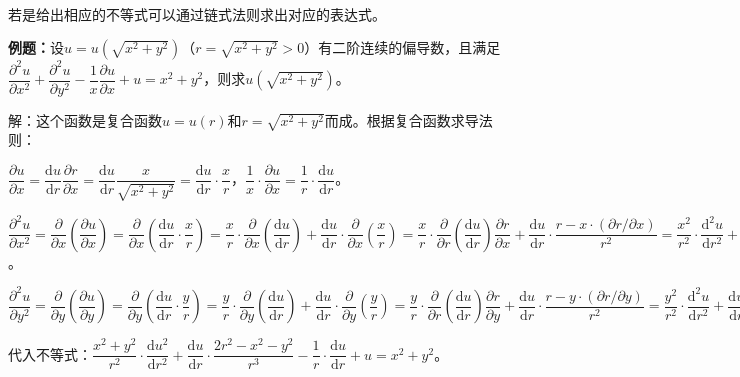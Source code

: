 \paragraph{} \leavevmode \medskip

若是给出相应的不等式可以通过链式法则求出对应的表达式。

\textbf{例题：}设$u=u(\sqrt{x^2+y^2})$（$r=\sqrt{x^2+y^2}>0$）有二阶连续的偏导数，且满足$\dfrac{\partial^2u}{\partial x^2}+\dfrac{\partial^2u}{\partial y^2}-\dfrac{1}{x}\dfrac{\partial u}{\partial x}+u=x^2+y^2$，则求$u(\sqrt{x^2+y^2})$。

解：这个函数是复合函数$u=u(r)$和$r=\sqrt{x^2+y^2}$而成。根据复合函数求导法则：

$\dfrac{\partial u}{\partial x}=\dfrac{\textrm{d}u}{\textrm{d}r}\dfrac{\partial r}{\partial x}=\dfrac{\textrm{d}u}{\textrm{d}r}\dfrac{x}{\sqrt{x^2+y^2}}=\dfrac{\textrm{d}u}{\textrm{d}r}\cdot\dfrac{x}{r}$，$\dfrac{1}{x}\cdot\dfrac{\partial u}{\partial x}=\dfrac{1}{r}\cdot\dfrac{\textrm{d}u}{\textrm{d}r}$。

$\dfrac{\partial^2u}{\partial x^2}=\dfrac{\partial}{\partial x}\left(\dfrac{\partial u}{\partial x}\right)=\dfrac{\partial}{\partial x}\left(\dfrac{\textrm{d}u}{\textrm{d}r}\cdot\dfrac{x}{r}\right)=\dfrac{x}{r}\cdot\dfrac{\partial}{\partial x}\left(\dfrac{\textrm{d}u}{\textrm{d}r}\right)+\dfrac{\textrm{d}u}{\textrm{d}r}\cdot\dfrac{\partial}{\partial x}\left(\dfrac{x}{r}\right)=\dfrac{x}{r}\cdot\dfrac{\partial}{\partial r}\left(\dfrac{\textrm{d}u}{\textrm{d}r}\right)\dfrac{\partial r}{\partial x}+\dfrac{\textrm{d}u}{\textrm{d}r}\cdot\dfrac{r-x\cdot(\partial r/\partial x)}{r^2}=\dfrac{x^2}{r^2}\cdot\dfrac{\textrm{d}^2u}{\textrm{d}r^2}+\dfrac{\textrm{d}u}{\textrm{d}r}\cdot\dfrac{r^2-x^2}{r^3}$。

$\dfrac{\partial^2u}{\partial y^2}=\dfrac{\partial}{\partial y}\left(\dfrac{\partial u}{\partial y}\right)=\dfrac{\partial}{\partial y}\left(\dfrac{\textrm{d}u}{\textrm{d}r}\cdot\dfrac{y}{r}\right)=\dfrac{y}{r}\cdot\dfrac{\partial}{\partial y}\left(\dfrac{\textrm{d}u}{\textrm{d}r}\right)+\dfrac{\textrm{d}u}{\textrm{d}r}\cdot\dfrac{\partial}{\partial y}\left(\dfrac{y}{r}\right)=\dfrac{y}{r}\cdot\dfrac{\partial}{\partial r}\left(\dfrac{\textrm{d}u}{\textrm{d}r}\right)\dfrac{\partial r}{\partial y}+\dfrac{\textrm{d}u}{\textrm{d}r}\cdot\dfrac{r-y\cdot(\partial r/\partial y)}{r^2}=\dfrac{y^2}{r^2}\cdot\dfrac{\textrm{d}^2u}{\textrm{d}r^2}+\dfrac{\textrm{d}u}{\textrm{d}r}\cdot\dfrac{r^2-x^2}{r^3}$

代入不等式：$\dfrac{x^2+y^2}{r^2}\cdot\dfrac{\textrm{d}u^2}{\textrm{d}r^2}+\dfrac{\textrm{d}u}{\textrm{d}r}\cdot\dfrac{2r^2-x^2-y^2}{r^3}-\dfrac{1}{r}\cdot\dfrac{\textrm{d}u}{\textrm{d}r}+u=x^2+y^2$。

